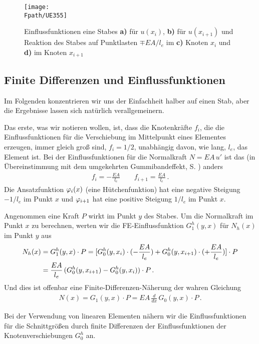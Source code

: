 \begin{figure}
\centering
\if {} \sidecaption \fi
\texttt{[image: \\Fpath/UE355]}
\caption{Einflussfunktionen eine Stabes \textbf{ a)} f\"{u}r $u(x_i)$, \textbf{ b)} f\"{u}r $u(x_{i+1})$ und Reaktion des Stabes auf Punktlasten $\mp EA/l_e$ im \textbf{ c)} Knoten $x_i$ und \textbf{ d)} im Knoten $x_{i+1}$}
\label{UE355}%
\end{figure}%

{\textcolor{sectionTitleBlue}{\section{Finite Differenzen und Einflussfunktionen}}}
Im Folgenden konzentrieren wir uns der Einfachheit halber auf einen Stab, aber die Ergebnisse lassen sich nat\"{u}rlich verallgemeinern.

Das erste, was wir notieren wollen, ist, dass die Knotenkr\"{a}fte $f_i$, die die Einflussfunktionen f\"{u}r die Verschiebung im Mittelpunkt eines Elementes erzeugen, immer gleich gro{\ss} sind, $f_i = 1/2$, unabh\"{a}ngig davon, wie lang, $l_e$, das Element ist. Bei der Einflussfunktionen f\"{u}r die Normalkraft $N = EA\,u'$ ist das (in \"{U}bereinstimmung mit dem umgekehrten Gummibandeffekt, S. \pageref{rubberband}) anders
\begin{align}
f_i = -\frac{EA}{l_e} \qquad f_{i+1} = \frac{EA}{l_e}\,.
\end{align}
Die Ansatzfunktion $\varphi_i(x)$ (eine H\"{u}tchenfunktion) hat eine negative Steigung $-1/l_e$ im Punkt $x$ und $\varphi_{i+1}$ hat eine positive Steigung $1/l_e$ im Punkt $x$.

Angenommen eine Kraft $P$ wirkt im Punkt $y$ des Stabes. Um die Normalkraft im Punkt $x$ zu berechnen, werten wir die FE-Einflussfunktion $G_1^h(y,x)$ f\"{u}r $N_h(x)$ im Punkt $y$ aus
\begin{align}
N_h(x) &= G_1^h(y,x) \cdot P = [G_0^h(y,x_i) \cdot (-\frac{EA}{l_e}) + G_0^h(y,x_{i+1}) \cdot (+\frac{EA}{l_e})] \cdot P\nonumber \\
 &= \frac{EA}{l_e}\,(G_0^h(y,x_{i+1}) - G_0^h(y,x_i)) \cdot P\,.
\end{align}
Und dies ist offenbar eine Finite-Differenzen-N\"{a}herung der wahren Gleichung
\begin{align}
N(x) = G_1(y,x)\cdot P = EA\,\frac{d}{dx}\,G_0(y,x) \cdot P\,.
\end{align}
\hspace*{0pt}\colorbox{highlightBlue}{\parbox{0.98\textwidth}{Bei der Verwendung von linearen Elementen n\"{a}hern wir die Einflussfunktionen f\"{u}r die Schnittgr\"{o}{\ss}en durch finite Differenzen der Einflussfunktionen der Knotenverschiebungen $G_0^h$ an.}}\\

